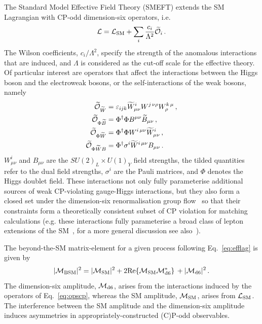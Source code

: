 \documentclass[twocolumn,preprintnumbers,superscriptaddress,nofootinbib,aps,prd,floatfix]{revtex4}
\begin{document}
The Standard Model Effective Field Theory (SMEFT) extends the SM Lagrangian with CP-odd dimension-six operators, i.e.
\begin{equation}
\label{eq:efflag}
    {\cal{L}}={\cal{L}}_{\text{SM}} + \sum_{i} {c_i\over \Lambda^2} \widetilde{{\cal{O}}}_i\,.
\end{equation}
The Wilson coefficients, $c_i/\Lambda^2$, specify the strength of the anomalous interactions that are induced, and  $\Lambda$ is considered as the cut-off scale for the effective theory. Of particular interest are operators that affect the interactions between the Higgs boson and the electroweak bosons, or the self-interactions of the weak bosons, namely
\begin{equation}
\label{eq:opscp}
\begin{split}
\widetilde{\cal{O}}_{\widetilde{W}}&=\varepsilon_{ijk} \widetilde{W}^{i}_{\mu\nu} W^{j\,\nu\rho} W^{k\,\mu}_{\rho} \,,\\
    \widetilde{\cal{O}}_{\Phi\widetilde{B}}&=\Phi^\dagger\Phi B^{\mu\nu}\widetilde{B}_{\mu\nu}\,,\\
   \widetilde{\cal{O}}_{\Phi \widetilde{W}}&=\Phi^\dagger \Phi  W^{i\,\mu\nu}\widetilde{W}^{i}_{\mu\nu}\,,\\
   \widetilde{\cal{O}}_{\Phi\widetilde{W}B}&=\Phi^\dagger \sigma^i  \widetilde{W}^{i\,\mu\nu}B_{\mu\nu}\,.
\end{split}
\end{equation}
$W^i_{\mu\nu}$ and $B_{\mu\nu}$ are the $SU(2)_L \times U(1)_Y$ field strengths, the tilded quantities refer to the dual field strengths, $\sigma^i$ are the Pauli matrices, and $\Phi$ denotes the Higgs doublet field. These interactions not only fully parameterise additional sources of weak CP-violating gauge-Higgs interactions, but they also form a closed set under the dimension-six renormalisation group flow~\cite{Alonso:2013hga,Grojean:2013kd,Englert:2014cva} so that their constraints form a theoretically consistent subset of CP violation for matching calculations (e.g. these interactions fully parameterise a broad class of lepton extensions of the SM~\cite{Bakshi:2021ofj,Naskar:2022rpg}, for a more general discussion see also~\cite{Degrande:2021zpv}).

The beyond-the-SM matrix-element for a given process following Eq.~\eqref{eq:efflag} is given by
\begin{equation}
\label{eq:diffxsec}
|{\cal{M}}_{\text{BSM}}|^2 = |{\cal{M}}_{\text{SM}}|^2 + 2\hbox{Re}\{{\cal{M}}_{\text{SM}}{\cal{M}}_{\text{d6}}^\ast \}\,+ |{\cal{M}}_{\text{d6}}|^{2}\,.
\end{equation}
The dimension-six amplitude, ${\cal{M}}_{\text{d6}}$, arises from the interactions induced by the operators of Eq.~\eqref{eq:opscp}, whereas the SM amplitude,  ${\cal{M}}_{\text{SM}}$, arises from ${\cal{L}}_{\text{SM}}$. The interference between the SM amplitude and the dimension-six amplitude induces asymmetries in appropriately-constructed (C)P-odd observables. 
\end{document}
